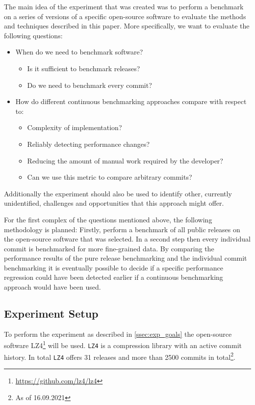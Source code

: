 \documentclass[	runningheads,
				a4paper]{llncs}
\begin{document}
	The main idea of the experiment that was created was to perform a benchmark on a series of versions of a specific open-source software to evaluate the methods and techniques described in this paper. More specifically, we want to evaluate the following questions:
	\begin{itemize}
		\item When do we need to benchmark software?
			\begin{itemize}
				\item Is it sufficient to benchmark releases?
				\item Do we need to benchmark every commit?
			\end{itemize}
		\item How do different continuous benchmarking approaches compare with respect to:
			\begin{itemize}
				\item Complexity of implementation?
				\item Reliably detecting performance changes?
				\item Reducing the amount of manual work required by the developer?
				\item Can we use this metric to compare arbitrary commits?
			\end{itemize}
	\end{itemize}

	Additionally the experiment should also be used to identify other, currently unidentified, challenges and opportunities that this approach might offer.

	For the first complex of the questions mentioned above, the following methodology is planned: Firstly, perform a benchmark of all public releases on the open-source software that was selected. In a second step then every individual commit is benchmarked for more fine-grained data. By comparing the performance results of the pure release benchmarking and the individual commit benchmarking it is eventually possible to decide if a specific performance regression could have been detected earlier if a continuous benchmarking approach would have been used.

	\subsection{Experiment Setup}
	\label{ssec:exp_setup}
	
	To perform the experiment as described in \autoref{ssec:exp_goals} the open-source software LZ4\footnote{\url{https://github.com/lz4/lz4}} will be used. \texttt{LZ4} is a compression library with an active commit history. In total \texttt{LZ4} offers 31 releases and more than 2500 commits in total\footnote{As of 16.09.2021}. 
	
\end{document}
